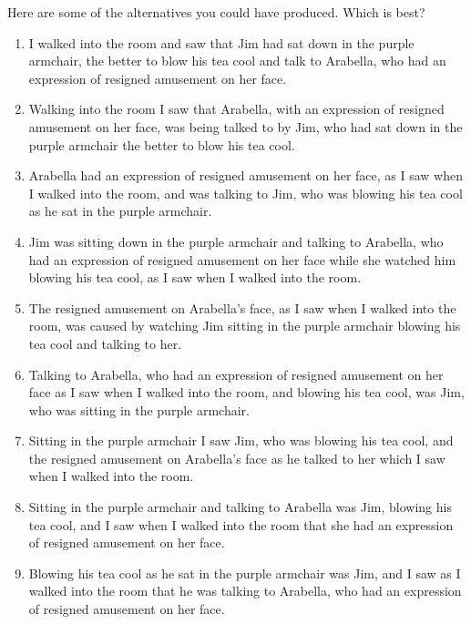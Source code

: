 \documentclass[11pt]{article}
\begin{document}
Here are some of the alternatives you could have produced. Which is best?



\begin{enumerate}

\item  I walked into the room and saw that Jim had sat down in the purple armchair, the better to blow his tea cool and talk to Arabella, who had an expression of resigned amusement on her face.

\item  Walking into the room I saw that Arabella, with an expression of resigned amusement on her face, was being talked to by Jim, who had sat down in the purple armchair the better to blow his tea cool.

\item  Arabella had an expression of resigned amusement on her face, as I saw when I walked into the room, and was talking to Jim, who was blowing his tea cool as he sat in the purple armchair.

\item  Jim was sitting down in the purple armchair and talking to Arabella, who had an expression of resigned amusement on her face while she watched him blowing his tea cool, as I saw when I walked into the room. 

\item  The resigned amusement on Arabella's face, as I saw when I walked into the room, was caused by watching Jim sitting in the purple armchair blowing his tea cool and talking to her.

\item  Talking to Arabella, who had an expression of resigned amusement on her face as I saw when I walked into the room, and blowing his tea cool, was Jim, who was sitting in the purple armchair.

\item  Sitting in the purple armchair I saw Jim, who was blowing his tea cool, and the resigned amusement on Arabella's face as he talked to her which I saw when I walked into the room.

\item  Sitting in the purple armchair and talking to Arabella was Jim, blowing his tea cool, and I saw when I walked into the room that she had an expression of resigned amusement on her face.

\item  Blowing his tea cool as he sat in the purple armchair was Jim, and I saw as I walked into the room that he was talking to Arabella, who had an expression of resigned amusement on her face.
\end{enumerate}
\end{document}
